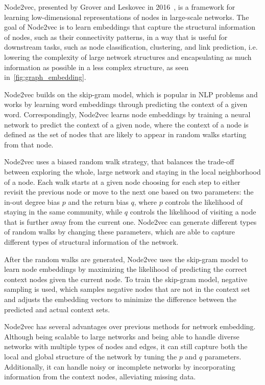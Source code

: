 Node2vec, presented by Grover and Leskovec in 2016~\cite{2016node2vec}, is a framework for learning low-dimensional representations of nodes in large-scale networks. The goal of Node2vec is to learn embeddings that capture the structural information of nodes, such as their connectivity patterns, in a way that is useful for downstream tasks, such as node classification, clustering, and link prediction, i.e. lowering the complexity of large network structures and encapsulating as much information as possible in a less complex structure, as seen in~\autoref{fig:graph_embedding}.

Node2vec builds on the skip-gram model, which is popular in NLP problems and works by learning word embeddings through predicting the context of a given word. Correspondingly, Node2vec learns node embeddings by training a neural network to predict the context of a given node, where the context of a node is defined as the set of nodes that are likely to appear in random walks starting from that node.

Node2vec uses a biased random walk strategy, that balances the trade-off between exploring the whole, large network and staying in the local neighborhood of a node. Each walk starts at a given node choosing for each step to either revisit the previous node or move to the next one based on two parameters: the in-out degree bias  $p$ and the return bias $q$, where $p$ controls the likelihood of staying in the same community, while $q$ controls the likelihood of visiting a node that is further away from the current one. Node2vec can generate different types of random walks by changing these parameters, which are able to capture different types of structural information of the network.

After the random walks are generated, Node2vec uses the skip-gram model to learn node embeddings by maximizing the likelihood of predicting the correct context nodes given the current node. To train the skip-gram model, negative sampling is used, which samples negative nodes that are not in the context set and adjusts the embedding vectors to minimize the difference between the predicted and actual context sets.

Node2vec has several advantages over previous methods for network embedding. Although being scalable to large networks and being able to handle diverse networks with multiple types of nodes and edges, it can still capture both the local and global structure of the network by tuning the $p$ and $q$ parameters. Additionally, it can handle noisy or incomplete networks by incorporating information from the context nodes, alleviating missing data. 

